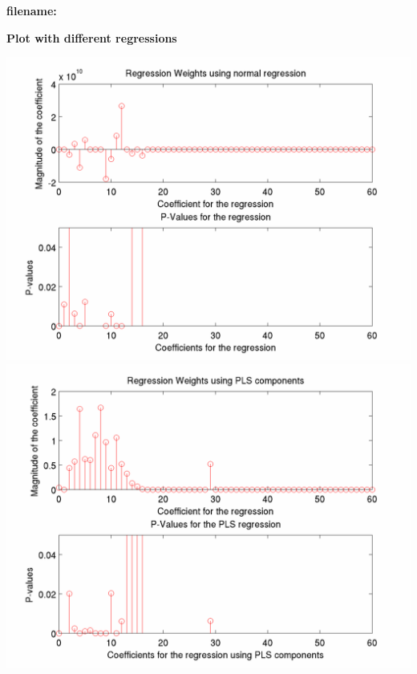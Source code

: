 \documentclass[12pt]{article}
\begin{document}
\begin{center}
\textbf{filename: \expandafter\detokenize\expandafter{\myvar}}

\textbf{Plot with different regressions}
\end{center}

\includegraphics[scale=0.2]{regression_weights_p_value.png}
\includegraphics[scale=0.2]{glmfit_regression_pls.png}
\end{document}
